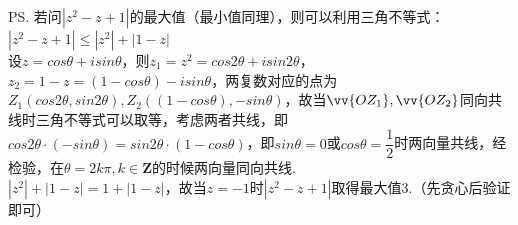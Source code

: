 \begin{enumerate}
\begin{jieda}
        \ps 若问$|z^2-z+1|$的最大值（最小值同理），则可以利用三角不等式：\\
        $|z^2-z+1| \leq |z^2| + |1-z|$ \\
        设$z = cos\theta + isin\theta$，则$z_1 = z^2 = cos2\theta + i sin2\theta$，$z_2 = 1-z = (1-cos\theta)-isin\theta$，两复数对应的点为$Z_1(cos2\theta, sin2\theta), Z_2((1-cos\theta), -sin\theta)$，故当$\vv{OZ_1}, \vv{OZ_2}$同向共线时三角不等式可以取等，考虑两者共线，即$cos2\theta \cdot (-sin\theta) = sin2\theta \cdot(1-cos\theta)$，即$sin\theta = 0$或$cos\theta = \dfrac{1}{2}$时两向量共线，经检验，在$\theta = 2k\pi, k \in \mathbf{Z}$的时候两向量同向共线. \\
        $|z^2| + |1-z| = 1 + |1-z|$，故当$z = -1$时$|z^2-z+1|$取得最大值3.（先贪心后验证即可）
    \end{jieda}
    
\end{enumerate}
